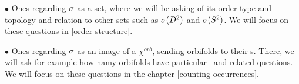 $\bullet$ Ones regarding ${\sigma}$ as a set, where we will be asking 
of its order type and topology and relation to other sets such as ${{\sigma}(D^2)}$ and ${{\sigma}(S^2)}$. 
We will focus on these questions in \ref{order structure}. 

$\bullet$ Ones regarding ${\sigma}$ as an image of a $\chi^{orb}$, sending orbifolds to their \Eoc s. 
There, we will ask for example how namy orbifolds have particular \Eoc\ and 
related questions. We will focus on these questions in the chapter \ref{counting occurrences}.  






